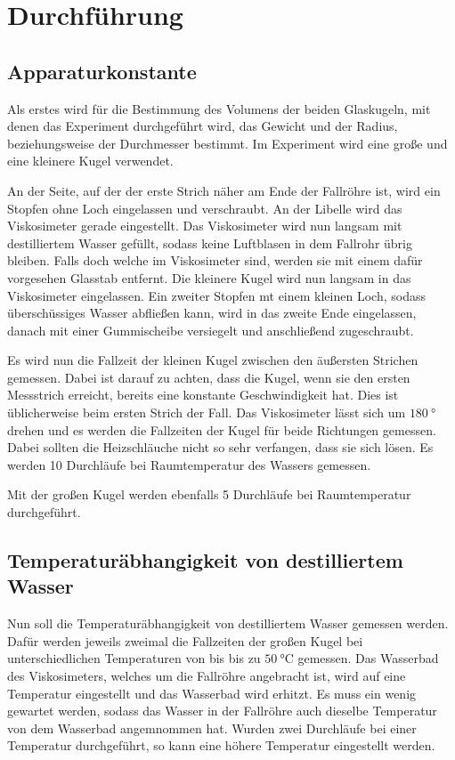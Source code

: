 \section{Durchführung}
\label{sec:Durchführung}

\subsection{Apparaturkonstante}
\label{subsec:app}

Als erstes wird für die Bestimmung des Volumens der beiden Glaskugeln, mit denen das Experiment durchgeführt wird,
das Gewicht und der Radius, beziehungsweise der Durchmesser bestimmt. Im Experiment wird eine große und eine kleinere Kugel verwendet.

An der Seite, auf der der erste Strich näher am Ende der Fallröhre ist, wird ein Stopfen ohne Loch eingelassen und verschraubt.
An der Libelle wird das Viskosimeter gerade eingestellt.
Das Viskosimeter wird nun langsam mit destilliertem Wasser gefüllt, sodass keine Luftblasen in dem Fallrohr %
übrig bleiben. Falls doch welche im Viskosimeter sind, werden sie mit einem dafür vorgesehen Glasstab entfernt. Die kleinere Kugel
wird nun langsam in das Viskosimeter eingelassen.
Ein zweiter Stopfen mt einem kleinen Loch, sodass überschüssiges Wasser abfließen kann, wird in das zweite Ende eingelassen, danach mit einer
Gummischeibe versiegelt und anschließend zugeschraubt.

Es wird nun die Fallzeit der kleinen Kugel zwischen den äußersten Strichen gemessen. Dabei ist darauf zu achten, dass die Kugel,
wenn sie den ersten Messstrich erreicht, bereits eine konstante Geschwindigkeit hat. Dies ist üblicherweise beim ersten Strich der Fall.
Das Viskosimeter lässt sich um $\SI{180}{\degree}$ drehen und es werden die Fallzeiten der Kugel für beide Richtungen gemessen. Dabei
sollten die Heizschläuche nicht so sehr verfangen, dass sie sich lösen.
Es werden 10 Durchläufe bei Raumtemperatur des Wassers gemessen.

Mit der großen Kugel werden ebenfalls 5 Durchläufe bei Raumtemperatur durchgeführt.

\subsection{Temperaturäbhangigkeit von destilliertem Wasser}
\label{subsec:tempAbh}

Nun soll die Temperaturäbhangigkeit von destilliertem Wasser gemessen werden. Dafür werden jeweils zweimal die Fallzeiten der großen Kugel bei
unterschiedlichen Temperaturen von bis bis zu $\SI{50}{\celsius}$ gemessen. 
Das Wasserbad des Viskosimeters, welches um die Fallröhre angebracht ist, wird auf eine Temperatur eingestellt und das Wasserbad wird erhitzt.
Es muss ein wenig gewartet werden, sodass das Wasser in der Fallröhre auch dieselbe Temperatur von dem Wasserbad angemnommen hat.
Wurden zwei Durchläufe bei einer Temperatur durchgeführt, so kann eine höhere Temperatur eingestellt werden.